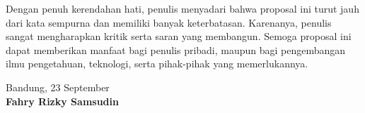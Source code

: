 Dengan penuh kerendahan hati, penulis menyadari bahwa proposal ini turut jauh dari kata sempurna dan memiliki banyak keterbatasan. Karenanya, penulis sangat mengharapkan kritik serta saran yang membangun. Semoga proposal ini dapat memberikan manfaat bagi penulis pribadi, maupun bagi pengembangan ilmu pengetahuan, teknologi, serta pihak-pihak yang memerlukannya.

\vspace{0.2cm}
\begin{flushright}
    Bandung, 23 September \the\year{}\\[1.2cm]
    \textbf{Fahry Rizky Samsudin}
\end{flushright}
